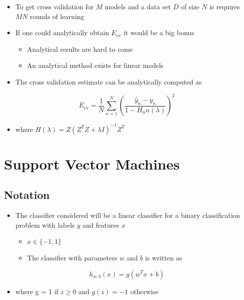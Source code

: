 \documentclass[11pt]{article}
\begin{document}
\begin{itemize}
\item To get cross validation for \(M\) models and a data set \(D\) of size \(N\) is requires \(MN\) rounds of learning
\item If one could analytically obtain \(E_\text{cv}\) it would be a big bonus
\begin{itemize}
\item Analytical results are hard to come
\item An analytical method exists for linear models
\end{itemize}

\item The cross validation estimate can be analytically computed as
\end{itemize}
\begin{equation}
  E_\text{cv} = \frac1N\sum_{n=1}^N(\frac{\hat y_n-y_n}{1-H_nn(\lambda)})^2
\end{equation}
\begin{itemize}
\item where \(H(\lambda)=Z(Z^TZ+ \lambda I)^{-1}Z^T\)
\end{itemize}

\section{Support Vector Machines}
\label{sec:org550c73c}
\subsection{Notation}
\label{sec:orgbf940fe}
\begin{itemize}
\item The classifier considered will be a linear classifier for a binary classification problem with labels \(y\) and features \(x\)
\begin{itemize}
\item \(x \in \{-1,1\}\)
\item The classifier with parameters \(w\) and \(b\)  is written as
\end{itemize}
\end{itemize}
\begin{equation}
  h_{w,b}(x)=g(w^Tx+b)
\end{equation}
\begin{itemize}
\item where g = 1 if \(z \geq 0\) and \(g(z)= -1\) otherwise
\end{itemize}
\end{document}
